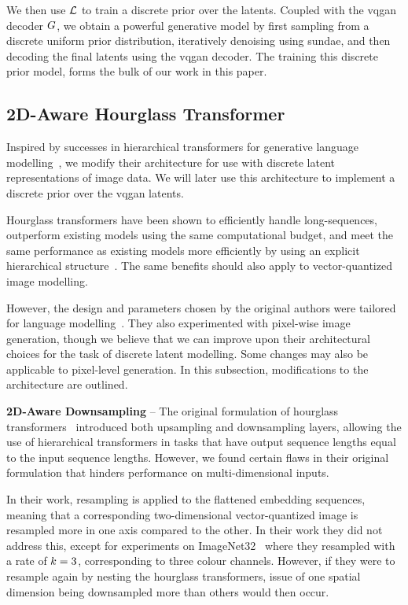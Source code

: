 We then use $\mathcal{L}$ to train a discrete prior over the latents. Coupled
with the \gls{vqgan} decoder $G$, we obtain a powerful generative
model by first sampling from a discrete uniform prior distribution, iteratively
denoising using \gls{sundae}, and then decoding the final latents using the
\gls{vqgan} decoder. The training this discrete prior model, forms the bulk of our
work in this paper.

\subsection{2D-Aware Hourglass Transformer}
\label{subsec:improvedHourglass}

Inspired by successes in hierarchical transformers for generative language
modelling~\cite{nawrot2021hierarchical}, we modify their architecture for use
with discrete latent representations of image data. We will later use this
architecture to implement a discrete prior over the \gls{vqgan} latents. 

Hourglass transformers have been shown to efficiently handle long-sequences,
outperform existing models using the same computational budget, and meet the
same performance as existing models more efficiently by using an explicit
hierarchical structure~\cite{nawrot2021hierarchical}. The same benefits should
also apply to vector-quantized image modelling. 

However, the design and parameters chosen by the original authors were tailored
for language modelling~\cite{nawrot2021hierarchical}. They also experimented
with pixel-wise image generation, though we believe that we can improve upon
their architectural choices for the task of discrete latent modelling. Some
changes may also be applicable to pixel-level generation. In this subsection,
modifications to the architecture are outlined.

\textbf{2D-Aware Downsampling} -- The original formulation of hourglass
transformers~\cite{nawrot2021hierarchical} introduced both upsampling and
downsampling layers, allowing the use of hierarchical transformers in tasks that
have output sequence lengths equal to the input sequence lengths. However,
we found certain flaws in their original formulation that hinders performance on
multi-dimensional inputs.

In their work, resampling is applied to the flattened embedding sequences,
meaning that a corresponding two-dimensional vector-quantized image is resampled
more in one axis compared to the other. In their work they did not address this,
except for experiments on ImageNet32~\cite{russakovsky2015imagenet} where they
resampled with a rate of $k=3$, corresponding to three colour
channels. However, if they were to resample again by nesting the hourglass
transformers, issue of one spatial dimension being
downsampled more than others would then occur.

